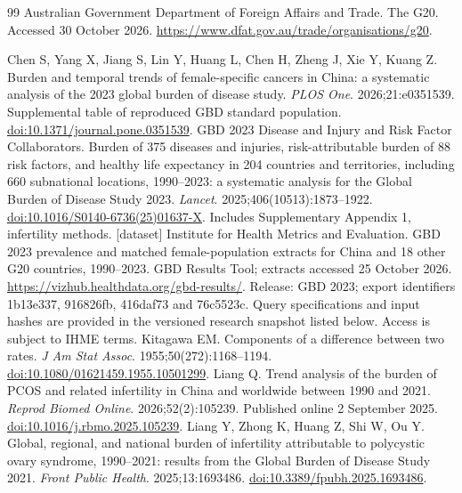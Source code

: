\documentclass[11pt,a4paper]{article}
\begin{document}
{\small{}
\begin{thebibliography}{99}
Australian Government Department of Foreign Affairs and Trade. The G20. Accessed 30 October 2026. \url{https://www.dfat.gov.au/trade/organisations/g20}.

Chen S, Yang X, Jiang S, Lin Y, Huang L, Chen H, Zheng J, Xie Y, Kuang Z. Burden and temporal trends of female-specific cancers in China: a systematic analysis of the 2023 global burden of disease study. \emph{PLOS One}. 2026;21:e0351539. Supplemental table of reproduced GBD standard population. \href{https://doi.org/10.1371/journal.pone.0351539}{doi:10.1371/journal.pone.0351539}.
GBD 2023 Disease and Injury and Risk Factor Collaborators. Burden of 375 diseases and injuries, risk-attributable burden of 88 risk factors, and healthy life expectancy in 204 countries and territories, including 660 subnational locations, 1990--2023: a systematic analysis for the Global Burden of Disease Study 2023. \emph{Lancet}. 2025;406(10513):1873--1922. \href{https://doi.org/10.1016/S0140-6736(25)01637-X}{doi:10.1016/S0140-6736(25)01637-X}. Includes Supplementary Appendix 1, infertility methods.
[dataset] Institute for Health Metrics and Evaluation. GBD 2023 prevalence and matched female-population extracts for China and 18 other G20 countries, 1990--2023. GBD Results Tool; extracts accessed 25 October 2026. \url{https://vizhub.healthdata.org/gbd-results/}. Release: GBD 2023; export identifiers 1b13e337, 916826fb, 416daf73 and 76c5523c. Query specifications and input hashes are provided in the versioned research snapshot listed below. Access is subject to IHME terms.
Kitagawa EM. Components of a difference between two rates. \emph{J Am Stat Assoc}. 1955;50(272):1168--1194. \href{https://doi.org/10.1080/01621459.1955.10501299}{doi:10.1080/01621459.1955.10501299}.
Liang Q. Trend analysis of the burden of PCOS and related infertility in China and worldwide between 1990 and 2021. \emph{Reprod Biomed Online}. 2026;52(2):105239. Published online 2 September 2025. \href{https://doi.org/10.1016/j.rbmo.2025.105239}{doi:10.1016/j.rbmo.2025.105239}.
Liang Y, Zhong K, Huang Z, Shi W, Ou Y. Global, regional, and national burden of infertility attributable to polycystic ovary syndrome, 1990--2021: results from the Global Burden of Disease Study 2021. \emph{Front Public Health}. 2025;13:1693486. \href{https://doi.org/10.3389/fpubh.2025.1693486}{doi:10.3389/fpubh.2025.1693486}.

\end{thebibliography}}
\end{document}

